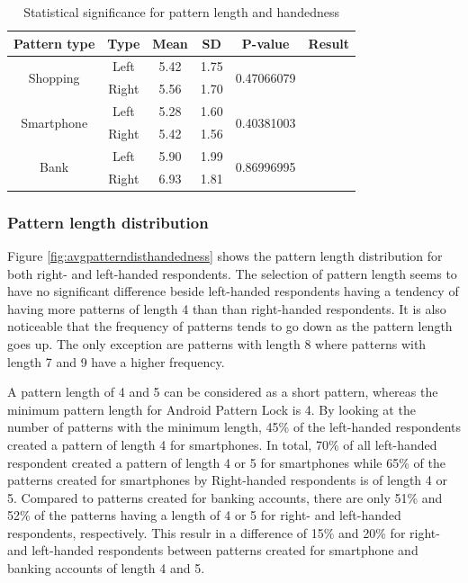     \begin{table}[H]
      \centering
      \begin{tabular}{ c | c | c | c | c | c }
      \hline
        {\bf Pattern type} & {\bf Type} & {\bf Mean} & {\bf SD} & {\bf P-value} & {\bf Result} \\ \hline
        \multirow{2}{*}{Shopping}   & Left  & 5.42 & 1.75 & \multirow{2}{*}{0.47066079} & \multirow{2}{*}{\bf \color{red}{Not significant}} \\
                                    & Right & 5.56 & 1.70 & & \\ \hline
        \multirow{2}{*}{Smartphone} & Left  & 5.28 & 1.60 & \multirow{2}{*}{0.40381003} & \multirow{2}{*}{\bf \color{red}{Not significant}} \\
                                    & Right & 5.42 & 1.56 & & \\ \hline
        \multirow{2}{*}{Bank}       & Left  & 5.90 & 1.99 & \multirow{2}{*}{0.86996995} & \multirow{2}{*}{\bf \color{red}{Not significant}} \\
                                    & Right & 6.93 & 1.81 & & \\ \hline
      \end{tabular}
      \caption{Statistical significance for pattern length and handedness}
      \label{tab:statsigLengthHandedness}
    \end{table}

    \subsubsection{Pattern length distribution}
    Figure \ref{fig:avgpatterndisthandedness} shows the pattern length distribution for both right- and left-handed respondents. The selection of pattern length seems to have no significant difference beside left-handed respondents having a tendency of having more patterns of length 4 than than right-handed respondents. It is also noticeable that the frequency of patterns tends to go down as the pattern length goes up. The only exception are patterns with length 8 where patterns with length 7 and 9 have a higher frequency.

    A pattern length of 4 and 5 can be considered as a short pattern, whereas the minimum pattern length for Android Pattern Lock is 4. By looking at the number of patterns with the minimum length, 45\% of the left-handed respondents created a pattern of length 4 for smartphones. In total, 70\% of all left-handed respondent created a pattern of length 4 or 5 for smartphones while 65\% of the patterns created for smartphones by Right-handed respondents is of length 4 or 5. Compared to patterns created for banking accounts, there are only 51\% and 52\% of the patterns having a length of 4 or 5 for right- and left-handed respondents, respectively. This resulr in a difference of 15\% and 20\% for right- and left-handed respondents between patterns created for smartphone and banking accounts of length 4 and 5.

